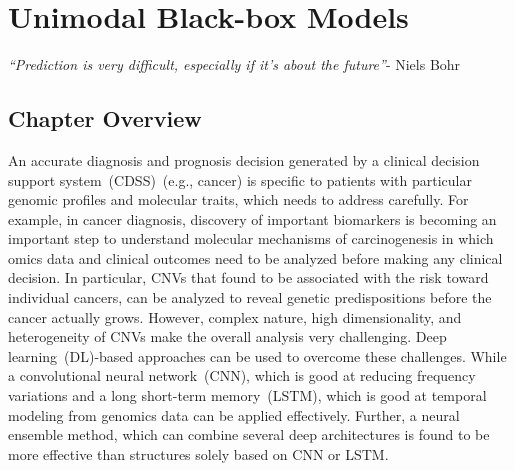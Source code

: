 \chapter{Unimodal Black-box Models}\label{chapter:uni_modality}
\textit{``Prediction is very difficult, especially if it's about the future''}-
Niels Bohr

\section{Chapter Overview} 
An accurate diagnosis and prognosis decision generated by a clinical decision support system~(CDSS)~(e.g., cancer) is specific to patients with particular genomic profiles and molecular traits, which needs to address carefully. For example, in cancer diagnosis, discovery of important biomarkers is becoming an important step to understand molecular mechanisms of carcinogenesis in which omics data and clinical outcomes need to be analyzed before making any clinical decision. In particular, CNVs that found to be associated with the risk toward individual cancers, can be analyzed to reveal genetic predispositions before the cancer actually grows. However, complex nature, high dimensionality, and heterogeneity of CNVs make the overall analysis very challenging. Deep learning~(DL)-based approaches can be used to overcome these challenges. While a convolutional neural network~(CNN), which is good at reducing frequency variations and a long short-term memory~(LSTM), which is good at temporal modeling from genomics data can be applied effectively. Further, a neural ensemble method, which can combine several deep architectures is found to be more effective than structures solely based on CNN or LSTM.

